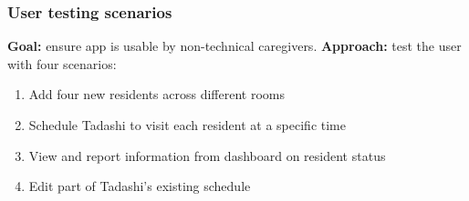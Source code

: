 \documentclass{beamer}
\begin{document}
\begin{frame}
  \frametitle{User testing scenarios}
  {\bf Goal: } ensure app is usable by non-technical caregivers.
  {\bf Approach: } test the user with four scenarios:
  \begin{enumerate}
    \item Add four new residents across different rooms
    \item Schedule Tadashi to visit each resident at a specific time
    \item View and report information from dashboard on resident status
    \item Edit part of Tadashi's existing schedule
  \end{enumerate}
\end{frame}
\end{document}
